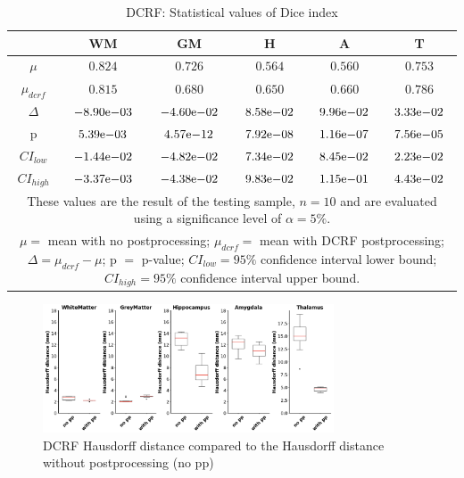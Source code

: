 \documentclass[journal]{IEEEtran}
\begin{document}
\begin{table}[ht]
\renewcommand{\arraystretch}{1.3}
\caption{DCRF: Statistical values of Dice index}
\label{tbl_dcrf_dice}
\centering
\tabcolsep=0.11cm
\begin{tabular}{c|c|c|c|c|c}
\hline
 & WM & GM & H & A & T\\
\hline
$\mu$&$0.824$&$0.726$&$0.564$&$0.560$&$0.753$\\
$\mu_{dcrf}$&$0.815$&$0.680$&$0.650$&$0.660$&$0.786$\\
$\Delta$&${-8.90}\mathrm{e}{-03}$&${-4.60}\mathrm{e}{-02}$&${8.58}\mathrm{e}{-02}$&${9.96}\mathrm{e}{-02}$&${3.33}\mathrm{e}{-02}$\\
p&${5.39}\mathrm{e}{-03}$&${4.57}\mathrm{e}{-12}$&${7.92}\mathrm{e}{-08}$&${1.16}\mathrm{e}{-07}$&${7.56}\mathrm{e}{-05}$\\
$CI_{low}$&${-1.44}\mathrm{e}{-02}$&${-4.82}\mathrm{e}{-02}$&${7.34}\mathrm{e}{-02}$&${8.45}\mathrm{e}{-02}$&${2.23}\mathrm{e}{-02}$\\
$CI_{high}$&${-3.37}\mathrm{e}{-03}$&${-4.38}\mathrm{e}{-02}$&${9.83}\mathrm{e}{-02}$&${1.15}\mathrm{e}{-01}$&${4.43}\mathrm{e}{-02}$\\
\hline
\multicolumn{6}{p{3.4in}}{These values are the result of the testing sample, $n=10$ and are evaluated using a significance level of $\alpha = 5\%$. }\\
\multicolumn{6}{p{3.4in}}{$\mu=$ mean with no postprocessing; $\mu_{dcrf}=$ mean with DCRF postprocessing; $\Delta=\mu_{dcrf}-\mu$; p $=$ p-value;  $CI_{low}= 95\%$ confidence interval lower bound; $CI_{high}= 95\%$ confidence interval upper bound.}\\

\end{tabular}
\end{table}



\begin{figure}[h!]
\centering
\includegraphics[width=3.4in]{img/boxplots/DCRF-HD.png}
\caption{DCRF Hausdorff distance compared to the Hausdorff distance without postprocessing (no pp)}
\label{fig_dcrf-hd}
\end{figure}
\end{document}
